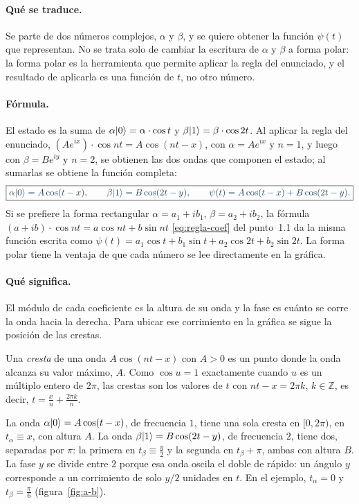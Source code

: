 \paragraph{Qué se traduce.}
Se parte de dos números complejos, $\alpha$ y $\beta$, y se quiere obtener la función
$\psi(t)$ que representan. No se trata solo de cambiar la escritura de $\alpha$ y $\beta$ a forma
polar: la forma polar es la herramienta que permite aplicar la regla del enunciado, y el
resultado de aplicarla es una función de $t$, no otro número.

\paragraph{Fórmula.}
El estado es la suma de $\alpha\lvert 0\rangle=\alpha\cdot\cos t$ y $\beta\lvert 1\rangle=\beta\cdot\cos 2t$. Al
aplicar la regla del enunciado, $(Ae^{ix})\cdot\cos nt=A\cos(nt-x)$, con $\alpha=Ae^{ix}$ y
$n=1$, y luego con $\beta=Be^{iy}$ y $n=2$, se obtienen las dos ondas que componen el estado; al
sumarlas se obtiene la función completa:
\begin{equation}\label{eq:a-b}
  \destacado{\alpha\ket0=A\cos(t-x),\qquad \beta\ket1=B\cos(2t-y),\qquad
  \psi(t)=A\cos(t-x)+B\cos(2t-y).}
\end{equation}
Si se prefiere la forma rectangular $\alpha=a_1+ib_1$, $\beta=a_2+ib_2$, la
fórmula~$(a+ib)\cdot\cos nt=a\cos nt+b\sin nt$ \eqref{eq:regla-coef} del punto~1.1 da la
misma función escrita como $\psi(t)=a_1\cos t+b_1\sin t+a_2\cos 2t+b_2\sin 2t$. La forma polar
tiene la ventaja de que cada número se lee directamente en la gráfica.

\paragraph{Qué significa.}
El módulo de cada coeficiente es la altura de su onda y la fase es cuánto se corre la onda hacia
la derecha. Para ubicar ese corrimiento en la gráfica se sigue la posición de las crestas.

\begin{definicionT}[Cresta]
Una \emph{cresta} de una onda $A\cos(nt-x)$ con $A>0$ es un punto donde la onda alcanza su valor
máximo, $A$. Como $\cos u=1$ exactamente cuando $u$ es un múltiplo entero de $2\pi$, las crestas
son los valores de $t$ con $nt-x=2\pi k$, $k\in\mathbb Z$, es decir, $t=\frac xn+\frac{2\pi k}n$.
\end{definicionT}

La onda $\alpha\lvert 0\rangle=A\cos(t-x)$, de frecuencia $1$, tiene una sola cresta en $[0,2\pi)$, en
$t_\alpha\equiv x$, con altura $A$. La onda $\beta\lvert 1\rangle=B\cos(2t-y)$, de frecuencia $2$, tiene
dos, separadas por $\pi$: la primera en $t_\beta\equiv\frac y2$ y la segunda en $t_\beta+\pi$,
ambas con altura $B$. La fase $y$ se divide entre $2$ porque esa onda oscila el doble de rápido:
un ángulo $y$ corresponde a un corrimiento de solo $y/2$ unidades en $t$. En el ejemplo,
$t_\alpha=0$ y $t_\beta=\frac\pi6$ (figura~\ref{fig:a-b}).

